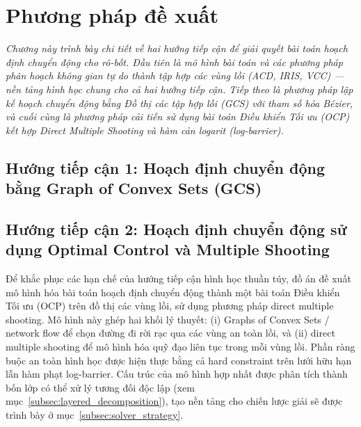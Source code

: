 \chapter{Phương pháp đề xuất}
\label{ch:proposed_method}

\indent\textit{
    Chương này trình bày chi tiết về hai hướng tiếp cận để giải quyết
    bài toán hoạch định chuyển động cho rô-bốt. Đầu tiên là mô hình bài toán và các
    phương pháp phân hoạch không gian tự do thành tập hợp các vùng lồi (ACD, IRIS, VCC)
    — nền tảng hình học chung cho cả hai hướng tiếp cận. Tiếp theo là phương pháp lập
    kế hoạch chuyển động bằng Đồ thị các tập hợp lồi (GCS) với tham số hóa Bézier, và
    cuối cùng là phương pháp cải tiến sử dụng bài toán Điều khiển Tối ưu (OCP) kết hợp
    Direct Multiple Shooting và hàm cản logarit (log-barrier).
}




\section{Hướng tiếp cận 1: Hoạch định chuyển động bằng Graph of Convex Sets (GCS)}
\label{sec:gcs_approach}




\section{Hướng tiếp cận 2: Hoạch định chuyển động sử dụng Optimal Control và Multiple Shooting}
\label{sec:ocp_dms_approach}

Để khắc phục các hạn chế của hướng tiếp cận hình học thuần túy, đồ án đề xuất mô hình hóa bài toán hoạch định chuyển động thành một bài toán Điều khiển Tối ưu (OCP) trên đồ thị các vùng lồi, sử dụng phương pháp direct multiple shooting. Mô hình này ghép hai khối lý thuyết: (i) Graphs of Convex Sets / network flow để chọn đường đi rời rạc qua các vùng an toàn lồi, và (ii) direct multiple shooting để mô hình hóa quỹ đạo liên tục trong mỗi vùng lồi. Phần ràng buộc an toàn hình học được hiện thực bằng cả hard constraint trên lưới hữu hạn lẫn hàm phạt log-barrier. Cấu trúc của mô hình hợp nhất được phân tích thành bốn lớp có thể xử lý tương đối độc lập (xem mục~\ref{subsec:layered_decomposition}), tạo nền tảng cho chiến lược giải sẽ được trình bày ở mục~\ref{subsec:solver_strategy}.


